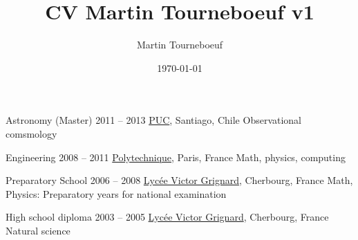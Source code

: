 \def\tbflanguage{english}
\def\tbfbordertop{1}
\def\tbfborderleft{0.7}

\ifx\HCode\undefined
%

\else

\fi

\title{CV Martin Tourneboeuf v1}
\author{Martin Tourneboeuf}
\date{\today}




\ifx\HCode\undefined \else
\maketitle
\fi







\begin{coordinatelist}
\end{coordinatelist}




\begin{yearlist}[7.7][\tbfborderleft][4]


\item[Astronomy (Master)]{2011 -- 2013}
  {
  \href{http://www.uc.cl/}{PUC}, Santiago, Chile
  }
  {   Observational comsmology}


\item[Engineering]{2008 -- 2011}
  {
  \href{https://www.polytechnique.edu/}{Polytechnique}, Paris, France
  }
  {    Math, physics, computing}


\item[Preparatory School]{2006 -- 2008}
  {
  \href{http://www.lycee-grignard.fr/}{Lyc\'ee Victor Grignard}, Cherbourg, France
  }
  {    Math, Physics: Preparatory years for national examination}


\item[High school diploma]{2003 -- 2005}
  {
  \href{http://www.lycee-grignard.fr/}{Lyc\'ee Victor Grignard}, Cherbourg, France
  }
  {    Natural science}

\end{yearlist}


